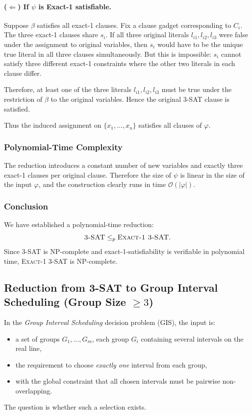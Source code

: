\documentclass[9pt]{extarticle}
\begin{document}
\paragraph{($\Leftarrow$) If $\psi$ is Exact-1 satisfiable.}

Suppose $\beta$ satisfies all exact-1 clauses.  
Fix a clause gadget corresponding to $C_i$.  The three exact-1 clauses share
$s_i$.  
If all three original literals $l_{i1},l_{i2},l_{i3}$ were false under the
assignment to original variables, then $s_i$ would have to be the unique true
literal in all three clauses simultaneously.  But this is impossible: $s_i$
cannot satisfy three different exact-1 constraints where the other two literals
in each clause differ.

Therefore, at least one of the three literals $l_{i1},l_{i2},l_{i3}$ must be
true under the restriction of $\beta$ to the original variables.  Hence the
original 3-SAT clause is satisfied.

Thus the induced assignment on $\{x_1,\dots,x_n\}$ satisfies all clauses of
$\varphi$.

\subsubsection*{Polynomial-Time Complexity}

The reduction introduces a constant number of new variables and exactly three
exact-1 clauses per original clause.  Therefore the size of $\psi$ is linear in
the size of the input $\varphi$, and the construction clearly runs in time
$\mathcal{O}(|\varphi|)$.

\subsubsection*{Conclusion}

We have established a polynomial-time reduction:
\[
    \textsc{3-SAT} \le_p \textsc{Exact-1 3-SAT}.
\]
Since \textsc{3-SAT} is NP-complete and exact-1-satisfiability is verifiable in
polynomial time, \textsc{Exact-1 3-SAT} is NP-complete.



\subsection{Reduction from \textsc{3-SAT} to Group Interval Scheduling (Group Size $\ge 3$)}

In the \emph{Group Interval Scheduling} decision problem (GIS), the input is:
\begin{itemize}
    \item a set of groups $G_1,\dots,G_m$, each group $G_i$ containing several
          intervals on the real line,
    \item the requirement to choose \emph{exactly one} interval from each group,
    \item with the global constraint that all chosen intervals must be
          pairwise non-overlapping.
\end{itemize}
The question is whether such a selection exists.  
\end{document}
